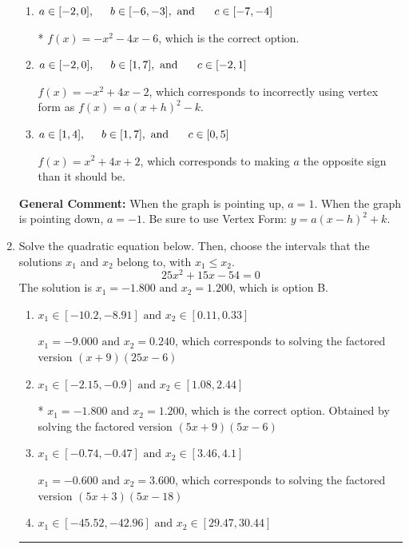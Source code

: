 \documentclass{extbook}[14pt]
\newcommand{\litem}[1]{\item #1

\rule{\textwidth}{0.4pt}}
\begin{document}
\begin{enumerate}
{\begin{enumerate}[label=\Alph*.]
$f(x)=x^{2} -4 x + 2$, which corresponds to incorrectly using vertex form as $f(x) = a(x+h)^2+k$ AND making $a$ the opposite sign than it should be.
\item \( a \in [-2, 0], \hspace*{5mm} b \in [-6, -3], \text{ and } \hspace*{5mm} c \in [-7, -4] \)

* $f(x)=-x^{2} -4 x -6$, which is the correct option.
\item \( a \in [-2, 0], \hspace*{5mm} b \in [1, 7], \text{ and } \hspace*{5mm} c \in [-2, 1] \)

$f(x)=-x^{2} +4 x -2$, which corresponds to incorrectly using vertex form as $f(x) = a(x+h)^2 - k$.
\item \( a \in [1, 4], \hspace*{5mm} b \in [1, 7], \text{ and } \hspace*{5mm} c \in [0, 5] \)

$f(x)=x^{2} +4 x + 2$, which corresponds to making $a$ the opposite sign than it should be.
\end{enumerate}

\textbf{General Comment:} When the graph is pointing up, $a=1$. When the graph is pointing down, $a=-1$. Be sure to use Vertex Form: $y = a(x-h)^2+k$.
}
\litem{
Solve the quadratic equation below. Then, choose the intervals that the solutions $x_1$ and $x_2$ belong to, with $x_1 \leq x_2$.
\[ 25x^{2} +15 x -54 = 0 \]The solution is \( x_1 = -1.800 \text{ and } x_2 = 1.200 \), which is option B.\begin{enumerate}[label=\Alph*.]
\item \( x_1 \in [-10.2, -8.91] \text{ and } x_2 \in [0.11, 0.33] \)

$x_1 = -9.000 \text{ and } x_2 = 0.240$, which corresponds to solving the factored version $(x + 9)(25x -6)$
\item \( x_1 \in [-2.15, -0.9] \text{ and } x_2 \in [1.08, 2.44] \)

* $x_1 = -1.800 \text{ and } x_2 = 1.200$, which is the correct option. Obtained by solving the factored version $(5x + 9)(5x -6)$
\item \( x_1 \in [-0.74, -0.47] \text{ and } x_2 \in [3.46, 4.1] \)

$x_1 = -0.600 \text{ and } x_2 = 3.600$, which corresponds to solving the factored version $(5x + 3)(5x -18)$
\item \( x_1 \in [-45.52, -42.96] \text{ and } x_2 \in [29.47, 30.44] \)


\end{enumerate}}
\end{enumerate}
\end{document}
